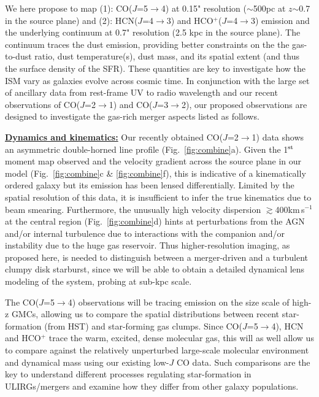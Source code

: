 \documentclass[12pt,a4paper]{article}
\newcommand{\rarr}{$\rightarrow$}
\newcommand{\bco}{\mbox{CO($J$=2\rarr1)}\xspace}
\newcommand{\eco}{\mbox{CO($J$=5\rarr4)}\xspace}
\newcommand{\rot}[3][HCN]{\mbox{#1($J$=#2\rarr#3)}\xspace}
\newcommand{\dhcn}{HCN($J$=4\rarr3)\xspace}
\newcommand{\hcop}{HCO$^+$\xspace}
\newcommand{\dhcop}{HCO$^+$($J$=4\rarr3)\xspace}
\newcommand{\kms}{km\,s$^{-1}$\xspace}
\newcommand{\Fig}[1]{Fig.~\ref{fig:#1}}
\begin{document}
We here propose to map (1): \eco at 0.15" resolution ($\sim$500pc at $z$$\sim$0.7 in the source plane) and 
(2): \dhcn and \dhcop emission and the underlying continuum at 0.7" resolution (2.5 kpc in the source plane).
The continuum traces the dust emission, 
providing better constraints on the the gas-to-dust ratio, dust temperature(s), dust mass,
and its spatial extent (and thus the surface density of the SFR).
These quantities are key to investigate how the ISM %
vary as galaxies evolve across cosmic time.
In conjunction with the large set of ancillary data from
rest-frame UV to radio wavelength and our recent observations of \bco and \rot[CO]{3}{2}, our
proposed observations are designed to investigate 
the gas-rich merger aspects listed as follows.

\underline{\bf Dynamics and kinematics:}
Our recently obtained \bco data shows an asymmetric double-horned line profile (\Fig{combine}a). Given
the 1$^{\rm st}$ moment map observed and the velocity gradient
across the source plane in our model (\Fig{combine}c \& \ref{fig:combine}f), this is indicative of
a kinematically ordered %
galaxy but its emission has been lensed differentially. 
Limited by the spatial resolution of this data, it is insufficient to infer the true 
kinematics due to beam smearing.
Furthermore, the unusually high velocity dispersion 
$\gtrsim$400\kms at the central region (\Fig{combine}d) hints at 
perturbations from the AGN and/or
internal turbulence
due to interactions with the companion
and/or instability due to the huge gas reservoir.
Thus higher-resolution imaging, as proposed here, is needed
to distinguish 
between a merger-driven and a turbulent clumpy disk starburst, 
since we will be able to obtain a detailed
dynamical lens modeling of the system, probing at sub-kpc scale. %

The \eco observations will be tracing emission on the size scale of high-z GMCs, 
allowing us to compare the spatial distributions between recent star-formation (from HST) and star-forming 
gas clumps. Since \eco, HCN and \hcop trace the warm, excited, dense molecular gas,
this will as well allow us to compare against the relatively unperturbed large-scale 
molecular environment and dynamical mass using our existing 
low-$J$ CO data.
Such comparisons are the key to understand different processes %
regulating star-formation 
in ULIRGs/mergers and examine how they differ from other galaxy populations.
\end{document}

